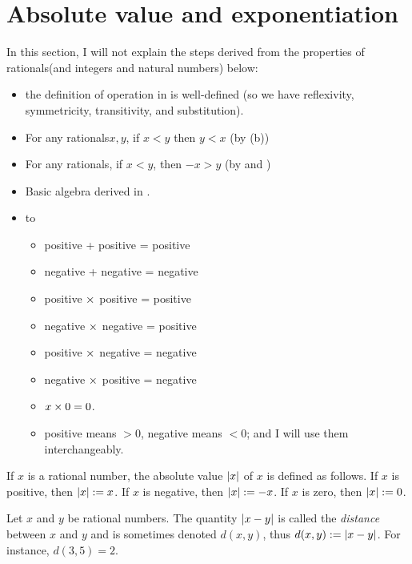\section{Absolute value and exponentiation}

\begin{note}
In this section, I will not explain the steps derived from the properties of rationals(and integers and natural numbers) below:
\begin{itemize}
    \item the definition of operation in  is well-defined (so we have reflexivity, symmetricity, transitivity, and substitution).
    \item For any rationals\(x, y\), if \(x < y\) then \(y < x\) (by (b))
    \item For any rationals, if \(x < y\), then \(-x > y\) (by  and )
    \item Basic algebra derived in .
    \item {} to 
        \begin{itemize}
            \item positive + positive = positive
            \item negative + negative = negative
            \item positive \(\times\) positive = positive
            \item negative \(\times\) negative = positive
            \item positive \(\times\) negative = negative
            \item negative \(\times\) positive = negative
            \item \(x \times 0 = 0\).
            \item positive means \(> 0\), negative means \(< 0\); and I will use them interchangeably.
        \end{itemize}
\end{itemize}
\end{note}

\begin{definition}  \label{def 4.3.1}
If \(x\) is a rational number, the absolute value \(\lvert x\rvert\) of \(x\) is defined as follows.
If \(x\) is positive, then \(\lvert x\rvert := x\).
If \(x\) is negative, then \(\lvert x\rvert := -x\).
If \(x\) is zero, then \(\lvert x\rvert := 0\).
\end{definition}

\begin{definition} [Distance] \label{def 4.3.2}
Let \(x\) and \(y\) be rational numbers.
The quantity \(\lvert x - y\rvert\) is called the \emph{distance} between \(x\) and \(y\) and is sometimes denoted \(d(x, y)\), thus \(d(x, y) := \lvert x - y\rvert\).
For instance, \(d(3, 5) = 2\).
\end{definition}

